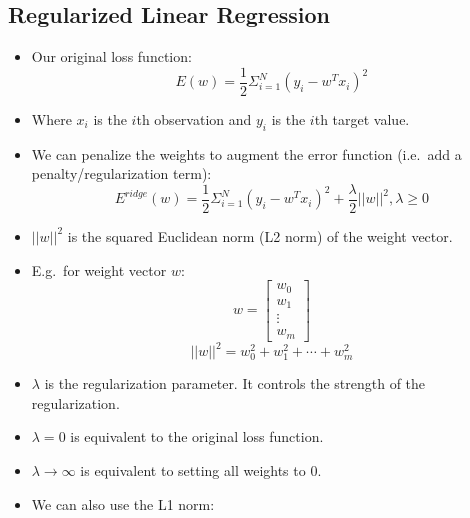 \documentclass[12pt]{article}
\begin{document}
        \subsection{Regularized Linear Regression}
            \begin{itemize}
                \item Our original loss function:
                \begin{equation}
                    E(w) = \frac{1}{2} \Sigma_{i=1}^N {(y_i - {w^T}x_i)}^2
                \end{equation}
                \item Where $x_i$ is the $i$th observation and $y_i$ is the $i$th target value.
                \item We can penalize the weights to augment the error function (i.e.\ add a penalty/regularization term):
                \begin{equation}
                    E^{ridge}(w) = \frac{1}{2} \Sigma_{i=1}^N {(y_i - {w^T}x_i)}^2 + \frac{\lambda}{2} ||w||^2, \lambda \geq 0
                \end{equation}
                \item $||w||^2$ is the squared Euclidean norm (L2 norm) of the weight vector.
                \item E.g.\ for weight vector $w$:
                \begin{equation}
                    w = \begin{bmatrix}
                        w_0 \\
                        w_1 \\
                        \vdots \\
                        w_m
                    \end{bmatrix}
                \end{equation}
                \begin{equation}
                    ||w||^2 = w_0^2 + w_1^2 + \cdots + w_m^2
                \end{equation}
                \item $\lambda$ is the regularization parameter. It controls the strength of the regularization.
                \item $\lambda = 0$ is equivalent to the original loss function.
                \item $\lambda \rightarrow \infty$ is equivalent to setting all weights to $0$.
                \item We can also use the L1 norm:

\end{itemize}
\end{document}
